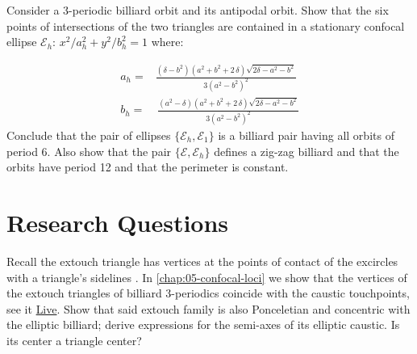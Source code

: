 \begin{exercise}
 Consider a 3-periodic billiard orbit and its antipodal orbit. Show that the six points of intersections of the two triangles are contained in a stationary confocal ellipse $\mathcal{E}_h$: $x^2/a_h^2+y^2/b_h^2=1$ where:


\begin{align*}
	a_h=& {\frac { \left(  \delta -b^2\right) \left( {a}^{2}+{b}^{2}+2\,\delta \right)\sqrt {2\delta-{a}^{2}-{b}^{2} 
			 }  }{3 \left( {a}^{2}-{
				b}^{2} \right) ^{2}}}\\
b_h=&  \,{\frac {\left( {a}^{2}-\delta \right)  \left( {a}^{2}+{b}^{2}+2\,\delta \right) \sqrt {2\delta -{a}^{2
			}-{b}^{2} } }{3 \left( {a}^{2}-
		{b}^{2} \right) ^{2}}}
%
\end{align*}
Conclude that the pair of ellipses $\{\mathcal{E}_h, \mathcal{E}_1\}$ is a billiard pair having all orbits of period 6.
Also show that the pair $\{\mathcal{E} , \mathcal{E}_h \}$ defines a zig-zag billiard and that the orbits have period 12 and  that the perimeter is  constant. %
\end{exercise}

\section{Research Questions}

\begin{question}
Recall the extouch triangle has vertices at the points of contact of the excircles with a triangle's sidelines \cite[Extouch triangle]{mw}. 
In \cref{chap:05-confocal-loci} we show that the vertices of the extouch triangles of billiard 3-periodics coincide with the caustic touchpoints, see it 
\href{https://bit.ly/33PufRv}{Live}. Show that said extouch family is also Ponceletian and concentric with the elliptic billiard; derive expressions for the semi-axes of its elliptic caustic. Is its center a triangle center? 
\label{que:02-extouch}
\end{question}
